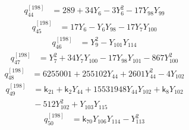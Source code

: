 \begin{equation}\label{q198:row:044}
\begin{aligned}
q_{44}^{[198]} &={} 289 + 34Y_{6} - 3Y_{6}^{2} - 17Y_{98}Y_{99}
\end{aligned}
\end{equation}
\begin{equation}\label{q198:row:045}
\begin{aligned}
q_{45}^{[198]} &={} 17Y_{6} - Y_{6}Y_{98} - 17Y_{7}Y_{100}
\end{aligned}
\end{equation}
\begin{equation}\label{q198:row:046}
\begin{aligned}
q_{46}^{[198]} &={} Y_{9}^{2} - Y_{101}Y_{114}
\end{aligned}
\end{equation}
\begin{equation}\label{q198:row:047}
\begin{aligned}
q_{47}^{[198]} &={} Y_{7}^{2} + 34Y_{7}Y_{100} - 17Y_{98}Y_{101} - 867Y_{100}^{2}
\end{aligned}
\end{equation}
\begin{equation}\label{q198:row:048}
\begin{aligned}
q_{48}^{[198]} &={} 6255001 + 255102Y_{44} + 2601Y_{44}^{2} - 4Y_{102}
\end{aligned}
\end{equation}
\begin{equation}\label{q198:row:049}
\begin{aligned}
q_{49}^{[198]} &={} \mathsf{k}_{21} + \mathsf{k}_{2}Y_{44} + 15531948Y_{44}Y_{102} + \mathsf{k}_{8}Y_{102}\\
&{} - 512Y_{102}^{2} + Y_{103}Y_{115}
\end{aligned}
\end{equation}
\begin{equation}\label{q198:row:050}
\begin{aligned}
q_{50}^{[198]} &={} \mathsf{k}_{70}Y_{106}Y_{114} - Y_{113}^{2}
\end{aligned}
\end{equation}
